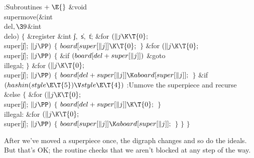 \Y\B\4:Subroutines\X${}\mathrel+\E{}$\6
\&{void} \\{supermove}(\&{int} \\{del}${},\39{}$\&{int} \\{delo})\1\1\2\2\6
${}\{{}$\1\6
\&{register} \&{int} \|j${},{}$ \|s${},{}$ \|t;\7
\&{for} ${}(\|j\K\T{0};{}$ \\{super}[\|j]; ${}\|j\PP){}$\5
${}\{{}$\1\6
${}\\{board}[\\{super}[\|j]]\K\T{0};{}$\6
\4${}\}{}$\2\6
\&{for} ${}(\|j\K\T{0};{}$ \\{super}[\|j]; ${}\|j\PP){}$\5
${}\{{}$\1\6
\&{if} ${}(\\{board}[\\{del}+\\{super}[\|j]]){}$\1\5
\&{goto} \\{illegal};\2\6
\4${}\}{}$\2\6
\&{for} ${}(\|j\K\T{0};{}$ \\{super}[\|j]; ${}\|j\PP){}$\5
${}\{{}$\1\6
${}\\{board}[\\{del}+\\{super}[\|j]]\K\\{aboard}[\\{super}[\|j]];{}$\6
\4${}\}{}$\2\6
\&{if} ${}(\\{hashin}(\\{style}\E\T{5})\V\\{style}\E\T{4}){}$\1\5
:Unmove the superpiece and recurse\X\2\6
\&{else}\5
${}\{{}$\1\6
\&{for} ${}(\|j\K\T{0};{}$ \\{super}[\|j]; ${}\|j\PP){}$\5
${}\{{}$\1\6
${}\\{board}[\\{del}+\\{super}[\|j]]\K\T{0};{}$\6
\4${}\}{}$\2\6
\4\\{illegal}:\6
\&{for} ${}(\|j\K\T{0};{}$ \\{super}[\|j]; ${}\|j\PP){}$\5
${}\{{}$\1\6
${}\\{board}[\\{super}[\|j]]\K\\{aboard}[\\{super}[\|j]];{}$\6
\4${}\}{}$\2\6
\4${}\}{}$\2\6
\4${}\}{}$\2\par
\fi

After we've moved a superpiece once, the digraph changes
and so do the
ideals. But that's OK; the  routine checks that
we aren't blocked at any step of the way.

